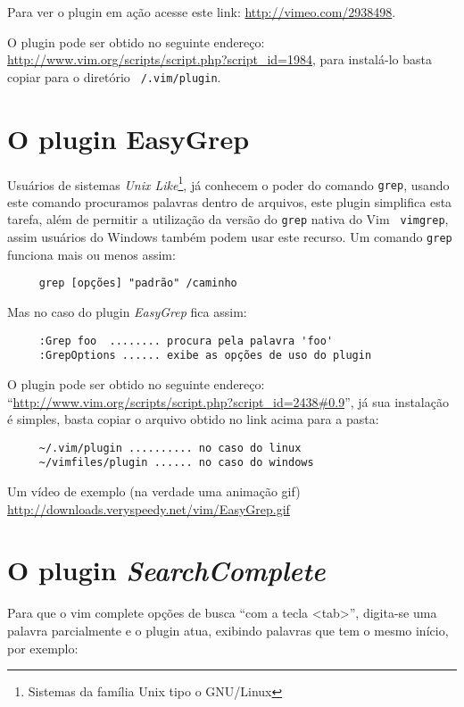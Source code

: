 Para ver o plugin em ação acesse este link: 
\url{http://vimeo.com/2938498}.


O plugin pode ser obtido no seguinte endereço: 
\url{http://www.vim.org/scripts/script.php?script\_id=1984},
para instalá-lo basta copiar para o diretório 
{\tt ~/.vim/plugin}.

\section{O plugin EasyGrep}
\label{sec:O plugin EasyGrep}

Usuários de sistemas {\em Unix Like}\footnote{Sistemas da família Unix tipo o
GNU/Linux}, já conhecem o poder do comando {\tt grep}, usando este comando
procuramos palavras dentro de arquivos, este plugin simplifica esta tarefa,
além de permitir a utilização da versão do {\tt grep} nativa do Vim {\tt
vimgrep}, assim usuários do Windows também podem usar este recurso. Um comando
{\tt grep} funciona mais ou menos assim:

\begin{verbatim}
     grep [opções] "padrão" /caminho
\end{verbatim}

Mas no caso do plugin {\em EasyGrep} fica assim:

\begin{verbatim}
     :Grep foo  ........ procura pela palavra 'foo'
     :GrepOptions ...... exibe as opções de uso do plugin
\end{verbatim}


O plugin pode ser obtido no seguinte endereço: 
``\url{http://www.vim.org/scripts/script.php?script\_id=2438#0.9}'', já sua instalação
é simples, basta copiar o arquivo obtido no link acima para a pasta:
   
\begin{verbatim}
     ~/.vim/plugin .......... no caso do linux
     ~/vimfiles/plugin ...... no caso do windows
\end{verbatim}

Um vídeo de exemplo (na verdade uma animação gif)
\url{http://downloads.veryspeedy.net/vim/EasyGrep.gif}

\section{O plugin {\em SearchComplete}}

Para que o vim complete opções de busca ``com a tecla <tab>'', digita-se uma
palavra parcialmente e o plugin atua, exibindo palavras que tem 
o mesmo início, por exemplo:

